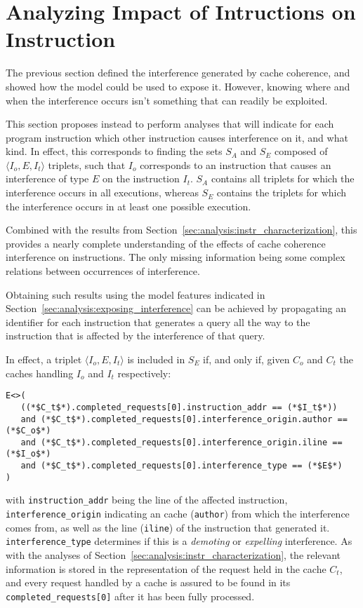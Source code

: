 \section{Analyzing Impact of Intructions on Instruction}
\label{sec:analysis:missing_link}
The previous section defined the interference generated by cache coherence, and
showed how the model could be used to expose it. However, knowing where and
when the interference occurs isn't something that can readily be exploited.

This section proposes instead to perform analyses that will indicate for each
program instruction which other instruction causes interference on it, and what
kind. In effect, this corresponds to finding the sets $S_A$ and $S_E$ composed
of $\langle I_o, E, I_t \rangle$ triplets, such that $I_o$ corresponds to an
instruction that causes an interference of type $E$ on the instruction $I_t$.
$S_A$ contains all triplets for which the interference occurs in all
executions, whereas $S_E$ contains the triplets for which the interference
occurs in at least one possible execution.

Combined with the results from
Section~\ref{sec:analysis:instr_characterization}, this provides a nearly
complete understanding of the effects of cache coherence interference on
instructions. The only missing information being some complex relations between
occurrences of interference.

Obtaining such results using the model features indicated in
Section~\ref{sec:analysis:exposing_interference} can be achieved by
propagating an identifier for each instruction that generates a query all the
way to the instruction that is affected by the interference of that query.


In effect, a triplet $\langle I_o, E, I_t \rangle$ is included in $S_E$ if, and
only if, given $C_o$ and $C_t$ the caches handling $I_o$ and $I_t$
respectively:
\begin{lstlisting}
E<>(
   ((*$C_t$*).completed_requests[0].instruction_addr == (*$I_t$*))
   and (*$C_t$*).completed_requests[0].interference_origin.author == (*$C_o$*)
   and (*$C_t$*).completed_requests[0].interference_origin.iline == (*$I_o$*)
   and (*$C_t$*).completed_requests[0].interference_type == (*$E$*)
)
\end{lstlisting}
with \lstinline!instruction_addr! being the line of the affected instruction,
\lstinline!interference_origin! indicating an cache (\lstinline!author!) from
which the interference comes from, as well as the line (\lstinline!iline!) of
the instruction that generated it. \lstinline!interference_type! determines
if this is a \textit{demoting} or \textit{expelling} interference. As with the
analyses of Section~\ref{sec:analysis:instr_characterization}, the relevant
information is stored in the representation of the request held in the cache
$C_t$, and every request handled by a cache is assured to be found in
its \lstinline!completed_requests[0]! after it has been fully processed.

